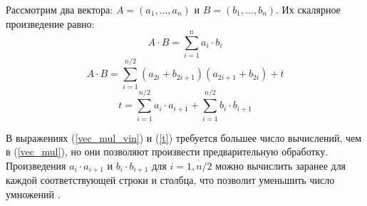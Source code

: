 Рассмотрим два вектора: $A = (a_1, \ldots, a_n)$ и $B = (b_1, \ldots, b_n)$.
Их скалярное произведение равно: 
\begin{equation}
	\label{vec_mul}
A \cdot B = \sum_{i=1}^{n} a_{i} \cdot b_{i}
\end{equation}
\begin{equation}
	\label{vec_mul_vin}
A \cdot B = \sum_{i=1}^{n/2} (a_{2i} + b_{2i+1})(a_{2i+1} + b_{2i}) + t
\end{equation}
\begin{equation}
	\label{t}
t = \sum_{i=1}^{n/2} a_{i} \cdot a_{i+1} + \sum_{i=1}^{n/2} b_{i} \cdot b_{i+1}
\end{equation}

В выражениях (\ref{vec_mul_vin}) и (\ref{t}) требуется большее число вычислений, чем в (\ref{vec_mul}), но они позволяют произвести предварительную обработку. 
Произведения $a_{i} \cdot a_{i+1}$ и $b_{i} \cdot b_{i+1}$ для $i=\overline{1, n/2}$ можно вычислить заранее для каждой соответствующей строки и столбца, что позволит уменьшить число умножений \cite{vinograd}. 







